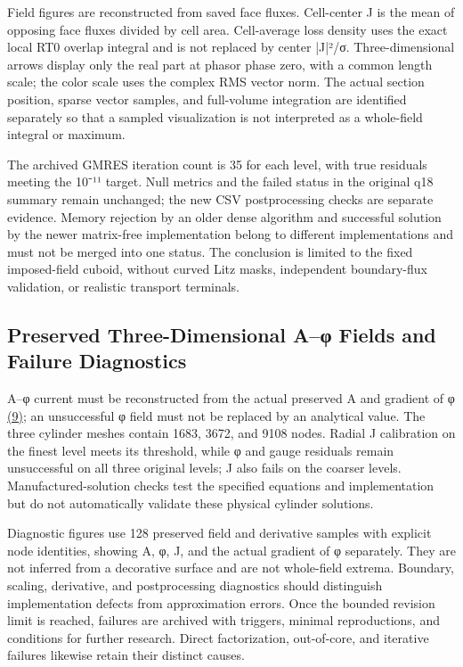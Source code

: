\documentclass[11pt]{article}
\begin{document}
Field figures are reconstructed from saved face fluxes. Cell-center J is the mean of opposing face fluxes divided by cell area. Cell-average loss density uses the exact local RT0 overlap integral and is not replaced by center |J|²/σ. Three-dimensional arrows display only the real part at phasor phase zero, with a common length scale; the color scale uses the complex RMS vector norm. The actual section position, sparse vector samples, and full-volume integration are identified separately so that a sampled visualization is not interpreted as a whole-field integral or maximum.


The archived GMRES iteration count is 35 for each level, with true residuals meeting the 10⁻¹¹ target. Null metrics and the failed status in the original q18 summary remain unchanged; the new CSV postprocessing checks are separate evidence. Memory rejection by an older dense algorithm and successful solution by the newer matrix-free implementation belong to different implementations and must not be merged into one status. The conclusion is limited to the fixed imposed-field cuboid, without curved Litz masks, independent boundary-flux validation, or realistic transport terminals.


\subsection*{Preserved Three-Dimensional A–φ Fields and Failure Diagnostics}
\hypertarget{S2.aphi.heading}{}
A–φ current must be reconstructed from the actual preserved A and gradient of φ \href{paper_en_single.pdf#E07}{(9)}; an unsuccessful φ field must not be replaced by an analytical value. The three cylinder meshes contain 1683, 3672, and 9108 nodes. Radial J calibration on the finest level meets its threshold, while φ and gauge residuals remain unsuccessful on all three original levels; J also fails on the coarser levels. Manufactured-solution checks test the specified equations and implementation but do not automatically validate these physical cylinder solutions.


Diagnostic figures use 128 preserved field and derivative samples with explicit node identities, showing A, φ, J, and the actual gradient of φ separately. They are not inferred from a decorative surface and are not whole-field extrema. Boundary, scaling, derivative, and postprocessing diagnostics should distinguish implementation defects from approximation errors. Once the bounded revision limit is reached, failures are archived with triggers, minimal reproductions, and conditions for further research. Direct factorization, out-of-core, and iterative failures likewise retain their distinct causes.
\end{document}
